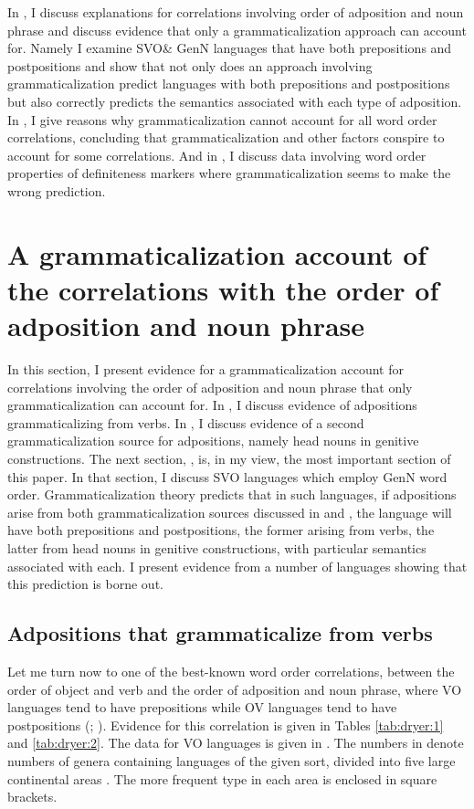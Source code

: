 \documentclass[output=paper]{langsci/langscibook}
\begin{document}
In , I discuss explanations for correlations involving order of adposition and noun phrase and discuss evidence that only a grammaticalization approach can account for. Namely I examine SVO\& GenN languages that have both prepositions and postpositions and show that not only does an approach involving grammaticalization predict languages with both prepositions and postpositions but also correctly predicts the semantics associated with each type of adposition. 
In , I give reasons why grammaticalization cannot account for all word order correlations, concluding that grammaticalization and other factors conspire to account for some correlations. 
And in , I discuss data involving word order properties of definiteness markers where grammaticalization seems to make the wrong prediction.

\section{A grammaticalization account of the correlations with the order of adposition and noun phrase} \label{sec:dryer:2}

In this section, I present evidence for a grammaticalization account for correlations involving the order of adposition and noun phrase that only grammaticalization can account for. In , I discuss evidence of adpositions grammaticalizing from verbs. In , I discuss evidence of a second grammaticalization source for adpositions, namely head nouns in genitive constructions. The next section, , is, in my view, the most important section of this paper. In that section, I discuss SVO languages which employ GenN word order. Grammaticalization theory predicts that in such languages, if adpositions arise from both grammaticalization sources discussed in  and , the language will have both prepositions and postpositions, the former arising from verbs, the latter from head nouns in genitive constructions, with particular semantics associated with each. I present evidence from a number of languages showing that this prediction is borne out.

\subsection{Adpositions that grammaticalize from verbs}\label{sec:dryer:2.1}

Let me turn now to one of the best-known word order correlations, between the order of object and verb and the order of adposition and noun phrase, where VO languages tend to have prepositions while OV languages tend to have postpositions (\citealt{Greenberg1963}; \citealt{Dryer1992}). Evidence for this correlation is given in Tables \ref{tab:dryer:1} and \ref{tab:dryer:2}. The data for VO languages is given in . The numbers in  denote numbers of genera containing languages of the given sort, divided into five large continental areas \citep{Dryer1989}. The more frequent type in each area is enclosed in square brackets.
\end{document}
